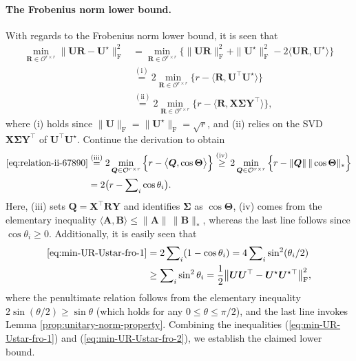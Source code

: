 \paragraph{The Frobenius norm lower bound.}

With regards to the Frobenius norm lower bound, it is seen that
%
\begin{align}
\min_{\bm{R}\in\mathcal{O}^{r\times r}}\big\|\bm{U}\bm{R}-\bm{U}^{\star}\big\|_{\mathrm{F}}^{2} & =\min_{\bm{R}\in\mathcal{O}^{r\times r}}\Big\{\|\bm{U}\bm{R}\|_{\mathrm{F}}^{2}+\|\bm{U}^{\star}\|_{\mathrm{F}}^{2}-2\big\langle\bm{U}\bm{R},\bm{U}^{\star}\big\rangle\Big\}\nonumber \\
 & \overset{(\mathrm{i})}{=} 2\min_{\bm{R}\in\mathcal{O}^{r\times r}}\Big\{ r-\big\langle\bm{R},\bm{U}^{\top}\bm{U}^{\star}\big\rangle\Big\}\nonumber \\
 & \overset{(\mathrm{ii})}{=} 2\min_{\bm{R}\in\mathcal{O}^{r\times r}}\Big\{ r-\big\langle\bm{R},\bm{X}\bm{\Sigma}\bm{Y}^{\top}\big\rangle\Big\} ,
	\label{eq:relation-ii-67890}
\end{align}
%
where (i) holds since $\|\bm{U}\|_{\mathrm{F}}=\|\bm{U}^{\star}\|_{\mathrm{F}}=\sqrt{r}$,
and (ii) relies on the SVD $\bm{X}\bm{\Sigma}\bm{Y}^{\top}$ of $\bm{U}^{\top}\bm{U}^{\star}$.
Continue the derivation to obtain
%
\begin{align}
\eqref{eq:relation-ii-67890}
	& \overset{(\mathrm{iii})}{=}  2\min_{\bm{Q}\in\mathcal{O}^{r\times r}}\Big\{ r-\big\langle\bm{Q},\cos\bm{\Theta}\big\rangle\Big\}
	 \overset{(\mathrm{iv})}{\geq} 2\min_{\bm{Q}\in\mathcal{O}^{r\times r}}\Big\{ r-\|\bm{Q}\|\,\|\cos\bm{\Theta}\|_{*}\Big\}\nonumber \\
 & =2 \big( r-\sum\nolimits_{i}\cos\theta_{i}\big).\label{eq:min-UR-Ustar-fro-1}
\end{align}
%
Here, (iii) sets $\bm{Q}=\bm{X}^{\top}\bm{R}\bm{Y}$ and identifies
$\bm{\Sigma}$ as $\cos\bm{\Theta}$,
(iv) comes from the elementary inequality $\langle \bm{A}, \bm{B} \rangle \leq \|\bm{A}\|\,\|\bm{B}\|_*$,
whereas the last line follows
since $\cos\theta_{i}\geq0$. Additionally, it is easily seen that
%
\begin{align}
\eqref{eq:min-UR-Ustar-fro-1}
	& =2\sum\nolimits_{i} (1-\cos\theta_{i})=4\sum\nolimits_{i} \sin^{2}(\theta_{i}/2)\nonumber \\
 & \geq \sum\nolimits_{i} \sin^{2}\theta_{i}
  =\frac{1}{2} \big\Vert \bm{U}\bm{U}^{\top}-{\bm{U}}^{\star}{\bm{U}}^{\star\top}\big\Vert _{\mathrm{F}}^2 ,
	\label{eq:min-UR-Ustar-fro-2}
\end{align}
%
where the penultimate relation follows from the elementary inequality
$2\sin(\theta/2)\geq\sin\theta$ (which holds for any $0\leq\theta\leq\pi/2$), and
the last line invokes Lemma \ref{prop:unitary-norm-property}.
Combining the inequalities (\ref{eq:min-UR-Ustar-fro-1}) and (\ref{eq:min-UR-Ustar-fro-2}),
we establish the claimed lower bound.








